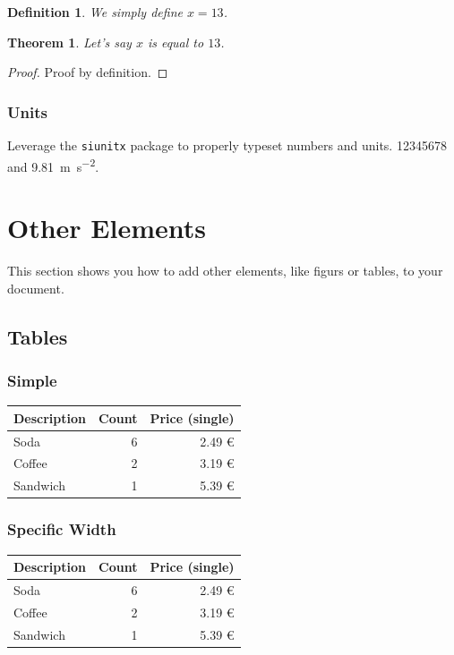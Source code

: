 \documentclass[parskip=half]{scrbook}
\newtheorem{definition}{Definition}
\newtheorem{theorem}{Theorem}
\begin{document}
\begin{definition}
	We simply define $x = 13$.
\end{definition}

\begin{theorem}
	Let's say $x$ is equal to $13$.
\end{theorem}

\begin{proof}
	Proof by definition.
\end{proof}

\subsection{Units}

Leverage the \texttt{siunitx} package to properly typeset numbers and units.
\num{12345678} and \SI{9.81}{\meter\per\second^2}.

\chapter{Other Elements}

This section shows you how to add other elements, like figurs or tables, to your document.

\section{Tables}

\subsection{Simple}

\begin{center}
\begin{tabular}{lrr}
	\toprule
	Description & Count & Price (single)\\
	\midrule
	Soda & 6 & 2.49 €\\
	Coffee & 2 & 3.19 €\\
	Sandwich & 1 & 5.39 €\\
	\bottomrule
\end{tabular}
\end{center}

\subsection{Specific Width}

\begin{center}
\begin{tabularx}{0.75\textwidth}{Xrr}
	\toprule
	Description & Count & Price (single)\\
	\midrule
	Soda & 6 & 2.49 €\\
	Coffee & 2 & 3.19 €\\
	Sandwich & 1 & 5.39 €\\
	\bottomrule
\end{tabularx}
\end{center}
\end{document}
